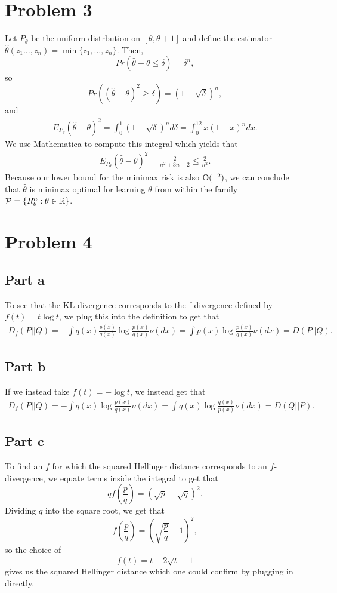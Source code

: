\documentclass{article}
\begin{document}
\section{Problem 3}
Let $P_\theta$ be the uniform distrbution on $[\theta,\theta+1]$ and define the estimator $\hat\theta(z_1\ldots,z_n)=\min\{z_1,\ldots,z_n\}$. Then, 
\[
Pr(\hat\theta-\theta\leq\delta)=\delta^n,
\]
so 
\[
Pr((\hat\theta-\theta)^2\geq\delta)=(1-\sqrt{\delta})^n,
\]
and 
\begin{align*}
E_{P_\theta}(\hat\theta-\theta)^2=\int_{0}^{1}(1-\sqrt{\delta})^nd\delta=\int_0^12x(1-x)^ndx.
\end{align*}
We use Mathematica to compute this integral which yields that
\begin{align*}
E_{P_\theta}(\hat\theta-\theta)^2=\frac{2}{n^2+3n+2}\leq\frac{2}{n^2}.
\end{align*}
Because our lower bound for the minimax risk is also $\operatorname{O}(^{-2})$, we can conclude that $\hat\theta$ is minimax optimal for learning $\theta$ from within the family $\mathcal P=\{R_\theta^n:\theta\in\mathbb{R}\}$.

\section{Problem 4}
\subsection{Part a}
To see that the KL divergence corresponds to the f-divergence defined by $f(t)=t\log t$, we plug this into the definition to get that
\begin{align*}
D_f(P||Q)=-\int q(x)\frac{p(x)}{q(x)}\log\frac{p(x)}{q(x)}\nu(dx)=\int p(x)\log\frac{p(x)}{q(x)}\nu(dx)=D(P||Q).
\end{align*} 
\subsection{Part b}
If we instead take $f(t)=-\log t$, we instead get that
\begin{align*}
	D_f(P||Q)=-\int q(x)\log\frac{p(x)}{q(x)}\nu(dx)=\int q(x)\log\frac{q(x)}{p(x)}\nu(dx)=D(Q||P).
\end{align*} 
\subsection{Part c}
To find an $f$ for which the squared Hellinger distance corresponds to an $f$-divergence, we equate terms inside the integral to get that 
\[
qf\left(\frac{p}{q}\right)=(\sqrt{p}-\sqrt{q})^2.
\] 
Dividing $q$ into the square root, we get that
\[
f\left(\frac{p}{q}\right)=\left(\sqrt{\frac{p}{q}}-1\right)^2,
\]
so the choice of 
\[
f(t)=t-2\sqrt{t}+1
\]
gives us the squared Hellinger distance which one could confirm by plugging in directly.
\end{document}
